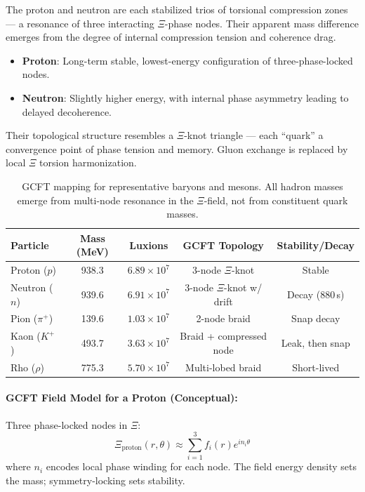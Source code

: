 The proton and neutron are each stabilized trios of torsional compression zones — a resonance of three interacting $\Xi$-phase nodes. Their apparent mass difference emerges from the degree of internal compression tension and coherence drag.

\begin{itemize}
  \item \textbf{Proton}: Long-term stable, lowest-energy configuration of three-phase-locked nodes.
  \item \textbf{Neutron}: Slightly higher energy, with internal phase asymmetry leading to delayed decoherence.
\end{itemize}

Their topological structure resembles a $\Xi$-knot triangle — each “quark” a convergence point of phase tension and memory. Gluon exchange is replaced by local $\Xi$ torsion harmonization.

\begin{table}[ht]
\centering
\begin{tabular}{lcccc}
\hline
\textbf{Particle} & \textbf{Mass (MeV)} & \textbf{Luxions} & \textbf{GCFT Topology} & \textbf{Stability/Decay} \\
\hline
Proton ($p$)     & 938.3   & $6.89 \times 10^7$    & 3-node $\Xi$-knot       & Stable \\
Neutron ($n$)    & 939.6   & $6.91 \times 10^7$    & 3-node $\Xi$-knot w/ drift & Decay (880\,s) \\
Pion ($\pi^+$)   & 139.6   & $1.03 \times 10^7$    & 2-node braid            & Snap decay \\
Kaon ($K^+$)     & 493.7   & $3.63 \times 10^7$    & Braid + compressed node & Leak, then snap \\
Rho ($\rho$)     & 775.3   & $5.70 \times 10^7$    & Multi-lobed braid       & Short-lived \\
\hline
\end{tabular}
\caption{GCFT mapping for representative baryons and mesons. All hadron masses emerge from multi-node resonance in the $\Xi$-field, not from constituent quark masses.}
\label{tab:hadron_gcft}
\end{table}

\paragraph{GCFT Field Model for a Proton (Conceptual):}
Three phase-locked nodes in $\Xi$:
\[
\Xi_{\text{proton}}(r, \theta) \approx \sum_{i=1}^3 f_i(r) e^{i n_i \theta}
\]
where $n_i$ encodes local phase winding for each node. The field energy density sets the mass; symmetry-locking sets stability.

